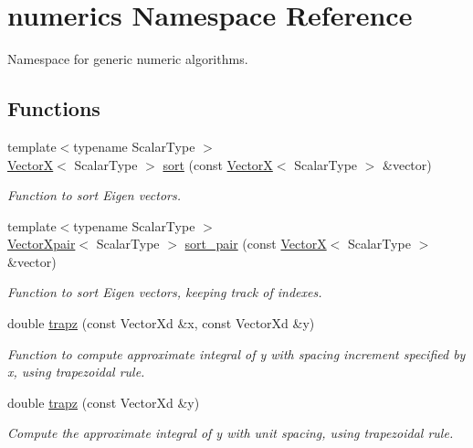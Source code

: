 \hypertarget{namespacenumerics}{\section{numerics Namespace Reference}
\label{namespacenumerics}
}


Namespace for generic numeric algorithms.  


\subsection*{Functions}
\begin{DoxyCompactItemize}
\item 
{\footnotesize template$<$typename Scalar\-Type $>$ }\\\hyperlink{typedefs_8h_ac264e7346c0c88c8a573518d1e8f8c3d}{Vector\-X}$<$ Scalar\-Type $>$ \hyperlink{namespacenumerics_a1633aabded7159bb15bbf573bf9e12c5}{sort} (const \hyperlink{typedefs_8h_ac264e7346c0c88c8a573518d1e8f8c3d}{Vector\-X}$<$ Scalar\-Type $>$ \&vector)
\begin{DoxyCompactList}\small\item\em Function to sort Eigen vectors. \end{DoxyCompactList}\item 
{\footnotesize template$<$typename Scalar\-Type $>$ }\\\hyperlink{typedefs_8h_a21ab9e8bc0dd8e3c178df27d98155cfa}{Vector\-Xpair}$<$ Scalar\-Type $>$ \hyperlink{namespacenumerics_a510fe73118ce8c79570ac87fa3e7df47}{sort\-\_\-pair} (const \hyperlink{typedefs_8h_ac264e7346c0c88c8a573518d1e8f8c3d}{Vector\-X}$<$ Scalar\-Type $>$ \&vector)
\begin{DoxyCompactList}\small\item\em Function to sort Eigen vectors, keeping track of indexes. \end{DoxyCompactList}\item 
double \hyperlink{namespacenumerics_a42e19b3ed2ac997af23b6cd39323c013}{trapz} (const Vector\-Xd \&x, const Vector\-Xd \&y)
\begin{DoxyCompactList}\small\item\em Function to compute approximate integral of {\itshape y} with spacing increment specified by {\itshape x}, using trapezoidal rule. \end{DoxyCompactList}\item 
double \hyperlink{namespacenumerics_a91e617ca6ea3fb6a16ff741ea31dc689}{trapz} (const Vector\-Xd \&y)
\begin{DoxyCompactList}\small\item\em Compute the approximate integral of {\itshape y} with unit spacing, using trapezoidal rule. \end{DoxyCompactList}\item 

\end{DoxyCompactItemize}
